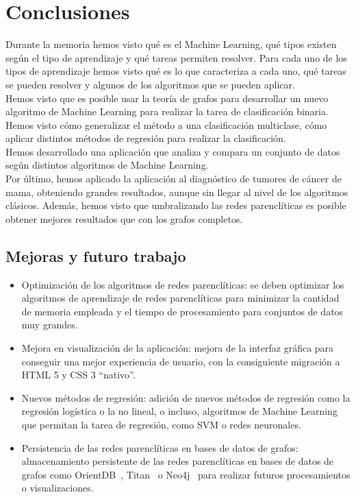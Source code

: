 \chapter{Conclusiones}\label{cap:conclusiones}

Durante la memoria hemos visto qué es el Machine Learning, qué tipos existen según el tipo de aprendizaje y qué tareas permiten resolver. Para cada uno de los tipos de aprendizaje hemos visto qué es lo que caracteriza a cada uno, qué tareas se pueden resolver y algunos de los algoritmos que se pueden aplicar.\\

Hemos visto que es posible usar la teoría de grafos para desarrollar un nuevo algoritmo de Machine Learning para realizar la tarea de clasificación binaria. Hemos visto cómo generalizar el método a una clasificación multiclase, cómo aplicar distintos métodos de regresión para realizar la clasificación.\\

Hemos desarrollado una aplicación que analiza y compara un conjunto de datos según distintos algoritmos de Machine Learning.\\

Por último, hemos aplicado la aplicación al diagnóstico de tumores de cáncer de mama, obteniendo grandes resultados, aunque sin llegar al nivel de los algoritmos clásicos. Además, hemos visto que umbralizando las redes parenclíticas es posible obtener mejores resultados que con los grafos completos.
   
\section{Mejoras y futuro trabajo}

\begin{itemize}
	\item Optimización de los algoritmos de redes parenclíticas: se deben optimizar los algoritmos de aprendizaje de redes parenclíticas para minimizar la cantidad de memoria empleada y el tiempo de procesamiento para conjuntos de datos muy grandes.
	 
	\item Mejora en visualización de la aplicación: mejora de la interfaz gráfica para conseguir una mejor experiencia de usuario, con la consiguiente migración a HTML 5 y CSS 3 ``nativo''.
	
	\item Nuevos métodos de regresión: adición de nuevos métodos de regresión como la regresión logística o la no lineal, o incluso, algoritmos de Machine Learning que permitan la tarea de regresión, como SVM o redes neuronales.
	
	\item Persistencia de las redes parenclíticas en bases de datos de grafos: almacenamiento persistente de las redes parenclíticas en bases de datos de grafos como OrientDB~\cite{orientdb}, Titan~\cite{titan} o Neo4j~\cite{neo4j} para realizar futuros procesamientos o visualizaciones.
\end{itemize}
